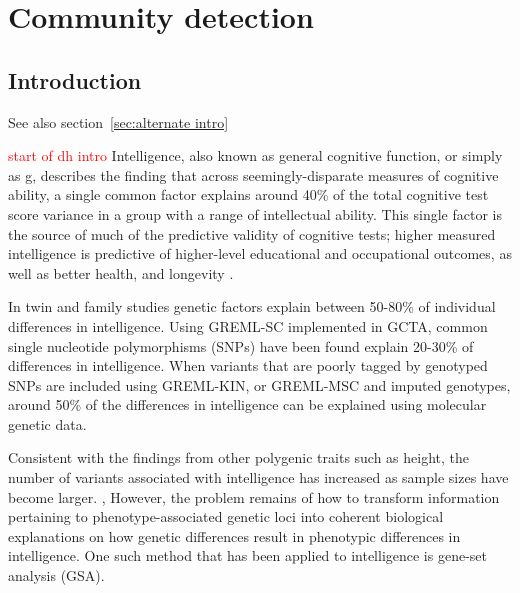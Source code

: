 
\chapter{Community detection}
\label{chap:community detection}






\section{Introduction}

See also section~\ref{sec:alternate intro}

\textcolor{red}{start of dh intro}
Intelligence, also known as general cognitive function,\cite{davies2015genetic} or simply as g,\cite{spearman1961general} describes the finding that across seemingly-disparate measures of cognitive ability, a single common factor explains around 40\% of the total cognitive test score variance in a group with a range of intellectual ability.  \cite{carroll1993human}  This single factor is the source of much of the predictive validity of cognitive tests; higher measured intelligence is predictive of higher-level educational and occupational outcomes, \cite{strenze2007intelligence}  as well as better health, and longevity .\cite{deary2012annrev} 

In twin and family studies genetic factors explain between 50-80\% of individual differences in intelligence. Using GREML-SC implemented in GCTA, \cite{yang2011gcta}  common single nucleotide polymorphisms (SNPs) have been found explain 20-30\% \cite{marioni2014common}  of differences in intelligence. When variants that are poorly tagged by genotyped SNPs are included using GREML-KIN, \cite{xia2016pedigree}  or GREML-MSC and imputed genotypes, around 50\% of the differences in intelligence can be explained using molecular genetic data. \cite{hill2018genomic} 

Consistent with the findings from other polygenic traits such as height, \cite{wood2014defining}  the number of variants associated with intelligence has increased as sample sizes have become larger. \cite{sniekers2017genome},\cite{hill2019combined}  However, the problem remains of how to transform information pertaining to phenotype-associated genetic loci into coherent biological explanations on how genetic differences result in phenotypic differences in intelligence. One such method that has been applied to intelligence is gene-set analysis (GSA). 

